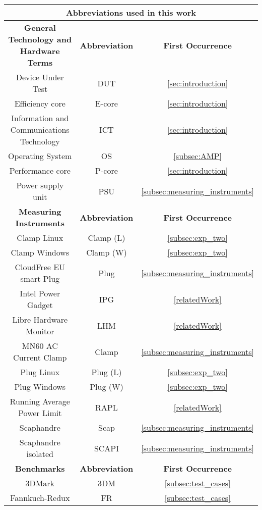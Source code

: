 \begin{table}[H]
    \centering
    \begin{tabular}{|| c | c | c ||}
    \hline
    \multicolumn{3}{||c||}{\textbf{Abbreviations used in this work}} \\ [0.5ex] \hline\hline
    \textbf{General Technology and Hardware Terms} & \textbf{Abbreviation} & \textbf{First Occurrence} \\\hline
    Device Under Test & DUT & \cref{sec:introduction}\\
    Efficiency core & E-core & \cref{sec:introduction}\\
    Information and Communications Technology & ICT & \cref{sec:introduction}\\
    Operating System & OS &\cref{subsec:AMP}\\
    Performance core & P-core & \cref{sec:introduction}\\
    Power supply unit & PSU & \cref{subsec:measuring_instruments}\\ 
    \hline
    \textbf{Measuring Instruments} & \textbf{Abbreviation} & \textbf{First Occurrence} \\\hline
    Clamp Linux& Clamp (L) & \cref{subsec:exp_two}\\
    Clamp Windows & Clamp (W) & \cref{subsec:exp_two}\\
    CloudFree EU smart Plug & Plug & \cref{subsec:measuring_instruments} \\
    Intel Power Gadget & IPG & \cref{relatedWork}\\
    Libre Hardware Monitor & LHM &\cref{relatedWork}\\
    MN60 AC Current Clamp & Clamp & \cref{subsec:measuring_instruments}\\
    Plug Linux & Plug (L) & \cref{subsec:exp_two}\\
    Plug Windows & Plug (W) & \cref{subsec:exp_two}\\
    Running Average Power Limit & RAPL & \cref{relatedWork}\\
    Scaphandre & Scap & \cref{subsec:measuring_instruments}\\
    Scaphandre isolated  & SCAPI & \cref{subsec:measuring_instruments}\\
    \hline 
    \textbf{Benchmarks} & \textbf{Abbreviation} & \textbf{First Occurrence} \\\hline
    3DMark  & 3DM & \cref{subsec:test_cases}\\
    Fannkuch-Redux& FR & \cref{subsec:test_cases}\\

\end{tabular}
\end{table}
